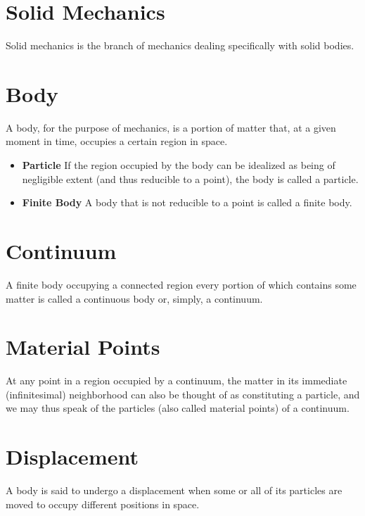 \documentclass[
  letterpaper,
  DIV=11,
  numbers=noendperiod]{scrreprt}
\providecommand{\tightlist}{%
  \setlength{\itemsep}{0pt}\setlength{\parskip}{0pt}}
\begin{document}
\section{Solid Mechanics}\label{solid-mechanics}

Solid mechanics is the branch of mechanics dealing specifically with
solid bodies.

\section{Body}\label{body}

A body, for the purpose of mechanics, is a portion of matter that, at a
given moment in time, occupies a certain region in space.

\begin{itemize}
\tightlist
\item
  \textbf{Particle} If the region occupied by the body can be idealized
  as being of negligible extent (and thus reducible to a point), the
  body is called a particle.
\item
  \textbf{Finite Body} A body that is not reducible to a point is called
  a finite body.
\end{itemize}

\section{Continuum}\label{continuum}

A finite body occupying a connected region every portion of which
contains some matter is called a continuous body or, simply, a
continuum.

\section{Material Points}\label{material-points}

At any point in a region occupied by a continuum, the matter in its
immediate (infinitesimal) neighborhood can also be thought of as
constituting a particle, and we may thus speak of the particles (also
called material points) of a continuum.

\section{Displacement}\label{displacement}

A body is said to undergo a displacement when some or all of its
particles are moved to occupy different positions in space.
\end{document}

